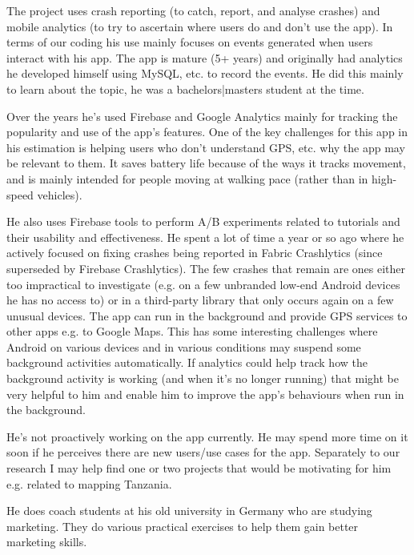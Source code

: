 
The project uses crash reporting (to catch, report, and analyse crashes) and mobile analytics (to try to ascertain where users do and don't use the app). In terms of our coding his use mainly focuses on events generated when users interact with his app.
The app is mature (5+ years) and originally had analytics he developed himself using MySQL, etc. to record the events. He did this mainly to learn about the topic, he was a bachelors|masters student at the time.

Over the years he's used Firebase and Google Analytics mainly for tracking the popularity and use of the app's features. One of the key challenges for this app in his estimation is helping users who don't understand GPS, etc. why the app may be relevant to them. It saves battery life because of the ways it tracks movement, and is mainly intended for people moving at walking pace (rather than in high-speed vehicles).

He also uses Firebase tools to perform A/B experiments related to tutorials and their usability and effectiveness.
He spent a lot of time a year or so ago where he actively focused on fixing crashes being reported in Fabric Crashlytics (since superseded by Firebase Crashlytics). The few crashes that remain are ones either too impractical to investigate (e.g. on a few unbranded low-end Android devices he has no access to) or in a third-party library that only occurs again on a few unusual devices.
The app can run in the background and provide GPS services to other apps e.g. to Google Maps. This has some interesting challenges where Android on various devices and in various conditions may suspend some background activities automatically. If analytics could help track how the background activity is working (and when it's no longer running) that might be very helpful to him and enable him to improve the app's behaviours when run in the background.

He's not proactively working on the app currently. He may spend more time on it soon if he perceives there are new users/use cases for the app. Separately to our research I may help find one or two projects that would be motivating for him e.g. related to mapping Tanzania.

He does coach students at his old university in Germany who are studying marketing. They do various practical exercises to help them gain better marketing skills. 

